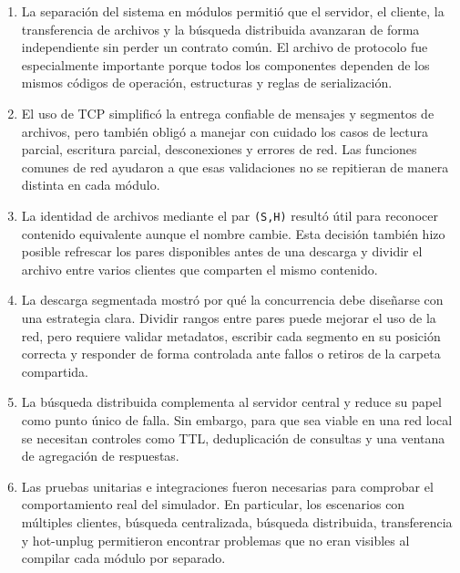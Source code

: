 \documentclass[12pt]{article}
\begin{document}
\begin{enumerate}[label=\arabic*.]
    \item La separación del sistema en módulos permitió que el servidor, el
    cliente, la transferencia de archivos y la búsqueda distribuida avanzaran
    de forma independiente sin perder un contrato común. El archivo de protocolo
    fue especialmente importante porque todos los componentes dependen de los
    mismos códigos de operación, estructuras y reglas de serialización.

    \item El uso de TCP simplificó la entrega confiable de mensajes y segmentos
    de archivos, pero también obligó a manejar con cuidado los casos de lectura
    parcial, escritura parcial, desconexiones y errores de red. Las funciones
    comunes de red ayudaron a que esas validaciones no se repitieran de manera
    distinta en cada módulo.

    \item La identidad de archivos mediante el par \texttt{(S,H)} resultó útil
    para reconocer contenido equivalente aunque el nombre cambie. Esta decisión
    también hizo posible refrescar los pares disponibles antes de una descarga y
    dividir el archivo entre varios clientes que comparten el mismo contenido.

    \item La descarga segmentada mostró por qué la concurrencia debe diseñarse
    con una estrategia clara. Dividir rangos entre pares puede mejorar el uso de
    la red, pero requiere validar metadatos, escribir cada segmento en su
    posición correcta y responder de forma controlada ante fallos o retiros de
    la carpeta compartida.

    \item La búsqueda distribuida complementa al servidor central y reduce su
    papel como punto único de falla. Sin embargo, para que sea viable en una red
    local se necesitan controles como TTL, deduplicación de consultas y una
    ventana de agregación de respuestas.

    \item Las pruebas unitarias e integraciones fueron necesarias para comprobar
    el comportamiento real del simulador. En particular, los escenarios con
    múltiples clientes, búsqueda centralizada, búsqueda distribuida,
    transferencia y hot-unplug permitieron encontrar problemas que no eran
    visibles al compilar cada módulo por separado.
\end{enumerate}
\end{document}
